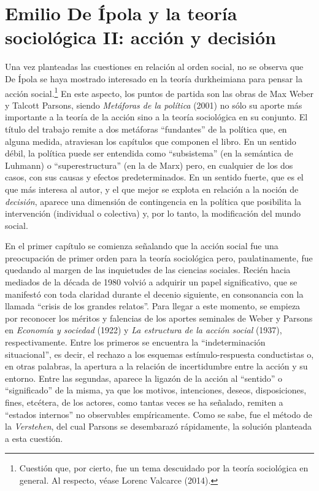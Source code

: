 \section{Emilio De Ípola y la teoría sociológica II: acción y decisión}

Una vez planteadas las cuestiones en relación al orden social, no se observa que De Ípola se haya mostrado interesado en la teoría durkheimiana para pensar la acción social.\footnote{Cuestión que, por cierto, fue un tema descuidado por la teoría sociológica en general. Al respecto, véase Lorenc Valcarce (2014).} En este aspecto, los puntos de partida son las obras de Max Weber y Talcott Parsons, siendo \emph{Metáforas de la política} (2001) no sólo su aporte más importante a la teoría de la acción sino a la teoría sociológica en su conjunto. El título del trabajo remite a dos metáforas \enquote{fundantes} de la política que, en alguna medida, atraviesan los capítulos que componen el libro. En un sentido débil, la política puede ser entendida como \enquote{subsistema} (en la semántica de Luhmann) o \enquote{superestructura} (en la de Marx) pero, en cualquier de los dos casos, con sus causas y efectos predeterminados. En un sentido fuerte, que es el que más interesa al autor, y el que mejor se explota en relación a la noción de \emph{decisión}, aparece una dimensión de contingencia en la política que posibilita la intervención (individual o colectiva) y, por lo tanto, la modificación del mundo social.

En el primer capítulo se comienza señalando que la acción social fue una preocupación de primer orden para la teoría sociológica pero, paulatinamente, fue quedando al margen de las inquietudes de las ciencias sociales. Recién hacia mediados de la década de 1980 volvió a adquirir un papel significativo, que se manifestó con toda claridad durante el decenio siguiente, en consonancia con la llamada \enquote{crisis de los grandes relatos}. Para llegar a este momento, se empieza por reconocer los méritos y falencias de los aportes seminales de Weber y Parsons en \emph{Economía y sociedad} (1922) y \emph{La estructura de la acción social} (1937), respectivamente. Entre los primeros se encuentra la \enquote{indeterminación situacional}, es decir, el rechazo a los esquemas estímulo-respuesta conductistas o, en otras palabras, la apertura a la relación de incertidumbre entre la acción y su entorno. Entre las segundas, aparece la ligazón de la acción al \enquote{sentido} o \enquote{significado} de la misma, ya que los motivos, intenciones, deseos, disposiciones, fines, etcétera, de los actores, como tantas veces se ha señalado, remiten a \enquote{estados internos} no observables empíricamente. Como se sabe, fue el método de la \emph{Verstehen}, del cual Parsons se desembarazó rápidamente, la solución planteada a esta cuestión.

